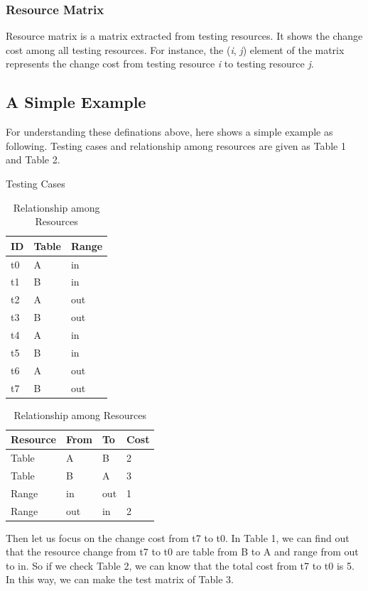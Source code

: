 \documentclass[12pt,a4paper]{article}
\begin{document}
\subsubsection{Resource Matrix}

Resource matrix is a matrix extracted from testing resources. It shows the change cost among all testing resources. For instance, the (\emph{i}, \emph{j}) element of the matrix represents the change cost from testing resource \emph{i} to testing resource \emph{j}. 

\subsection{A Simple Example}

For understanding these definations above, here shows a simple example as following. Testing cases and relationship among resources are given as Table 1 and Table 2.

\begin{table}[htbp]
\parbox{.4\textwidth}{
\centering
\caption{Testing Cases}
\begin{tabular}{|l|l|l|}\hline
	ID & Table & Range\\\hline
	t0 & A & in\\\hline
	t1 & B & in\\\hline
	t2 & A & out\\\hline
	t3 & B & out\\\hline
	t4 & A & in\\\hline
	t5 & B & in\\\hline
	t6 & A & out\\\hline
	t7 & B & out\\\hline
\end{tabular}
}
\hfill
\parbox{.4\textwidth}{
\centering
\caption{Relationship among Resources}
\begin{tabular}{|l|l|l|l|}\hline
	Resource & From & To & Cost\\\hline
	Table & A & B & 2\\\hline
	Table & B & A & 3\\\hline
	Range & in & out & 1\\\hline
	Range & out & in & 2\\\hline
\end{tabular}
}
\end{table}

Then let us focus on the change cost from t7 to t0. In Table 1, we can find out that the resource change from t7 to t0 are table from B to A and range from out to in. So if we check Table 2, we can know that the total cost from t7 to t0 is 5. In this way, we can make the test matrix of Table 3.
\end{document}
